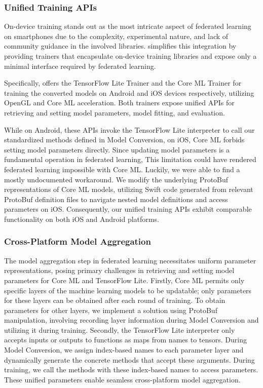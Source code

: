 \subsubsection{Unified Training APIs}
On-device training stands out as the most intricate aspect of federated learning
on smartphones due to the complexity, experimental nature,
and lack of community guidance in the involved libraries.
\fedkit simplifies this integration by providing trainers that encapsulate
on-device training libraries and expose only a minimal interface required by
federated learning.

Specifically,
\fedkit offers the TensorFlow Lite Trainer and the Core ML Trainer for training
the converted models on Android and iOS devices respectively,
utilizing OpenGL and Core ML acceleration.
Both trainers expose unified APIs for retrieving and setting model parameters,
model fitting, and evaluation.

While on Android,
these APIs invoke the TensorFlow Lite interpreter to call our standardized
methods defined in Model Conversion, on iOS,
Core ML forbids setting model parameters directly.
Since updating model parameters is a fundamental operation in federated
learning,
This limitation could have rendered federated learning impossible with Core ML.
Luckily, we were able to find a mostly undocumented workaround.
We modify the underlying ProtoBuf representations of Core ML models,
utilizing Swift code generated from relevant ProtoBuf definition files to
navigate nested model definitions and access parameters on iOS. Consequently,
our unified training APIs exhibit comparable functionality on both iOS and
Android platforms.

\subsubsection{Cross-Platform Model Aggregation}
The model aggregation step in federated learning necessitates uniform parameter
representations,
posing primary challenges in retrieving and setting model parameters for Core ML
and TensorFlow Lite. Firstly,
Core ML permits only specific layers of the machine learning models to be
updatable;
only parameters for these layers can be obtained after each round of training.
To obtain parameters for other layers,
we implement a solution using ProtoBuf manipulation,
involving recording layer information during Model Conversion and utilizing it
during training. Secondly,
the TensorFlow Lite interpreter only accepts inputs or outputs to functions as
maps from names to tensors. During Model Conversion,
we assign index-based names to each parameter layer and dynamically generate the
concrete methods that accept these arguments. During training,
we call the methods with these index-based names to access parameters.
These unified parameters enable seamless cross-platform model aggregation.

